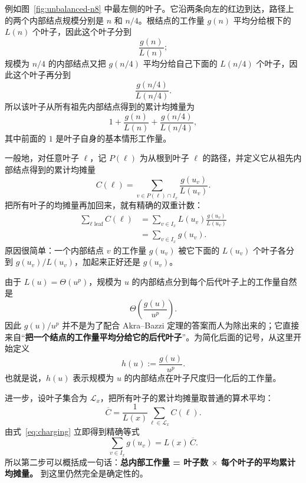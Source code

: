 \documentclass[11pt,a4paper]{article}
\begin{document}
例如图~\ref{fig:unbalanced-n8} 中最左侧的叶子。它沿两条向左的红边到达，路径上的两个内部结点规模分别是 $n$ 和 $n/4$。根结点的工作量 $g(n)$ 平均分给根下的 $L(n)$ 个叶子，因此这个叶子分到
\[
\frac{g(n)}{L(n)};
\]
规模为 $n/4$ 的内部结点又把 $g(n/4)$ 平均分给自己下面的 $L(n/4)$ 个叶子，因此这个叶子再分到
\[
\frac{g(n/4)}{L(n/4)}.
\]
所以该叶子从所有祖先内部结点得到的累计均摊量为
\[
1+\frac{g(n)}{L(n)}+\frac{g(n/4)}{L(n/4)},
\]
其中前面的 $1$ 是叶子自身的基本情形工作量。

一般地，对任意叶子 $\ell$，记 $P(\ell)$ 为从根到叶子 $\ell$ 的路径，并定义它从祖先内部结点得到的累计均摊量
\begin{equation}
C(\ell)=\sum_{v\in P(\ell)\cap I_x}\frac{g(u_v)}{L(u_v)}.
\end{equation}
把所有叶子的均摊量再加回来，就有精确的双重计数：
\begin{align}
\sum_{\ell\text{ leaf}} C(\ell)
&=\sum_{v\in I_x} L(u_v)\frac{g(u_v)}{L(u_v)}\\
&=\sum_{v\in I_x}g(u_v).
\label{eq:charging}
\end{align}
原因很简单：一个内部结点 $v$ 的工作量 $g(u_v)$ 被它下面的 $L(u_v)$ 个叶子各分到 $g(u_v)/L(u_v)$，加起来正好还是 $g(u_v)$。

由于 $L(u)=\Theta(u^p)$，规模为 $u$ 的内部结点分到每个后代叶子上的工作量自然是
\begin{equation}
\Theta\!\left(\frac{g(u)}{u^p}\right).
\end{equation}
因此 $g(u)/u^p$ 并不是为了配合 Akra--Bazzi 定理的答案而人为除出来的；它直接来自“\textbf{把一个结点的工作量平均分给它的后代叶子}”。为简化后面的记号，从这里开始定义
\begin{equation}
h(u):=\frac{g(u)}{u^p}.
\label{eq:normalized-per-leaf-work-v46}
\end{equation}
也就是说，$h(u)$ 表示规模为 $u$ 的内部结点在叶子尺度归一化后的工作量。

进一步，设叶子集合为 $\mathcal{L}_x$，把所有叶子的累计均摊量取普通的算术平均：
\begin{equation}
\overline{C}
=\frac{1}{L(x)}\sum_{\ell\in\mathcal{L}_x} C(\ell).
\label{eq:average-leaf-charge}
\end{equation}
由式~\eqref{eq:charging} 立即得到精确等式
\begin{equation}
\sum_{v\in I_x}g(u_v)=L(x)\,\overline{C}.
\label{eq:deterministic-leaf-average}
\end{equation}
所以第二步可以概括成一句话：\textbf{总内部工作量 = 叶子数 $\times$ 每个叶子的平均累计均摊量。} 到这里仍然完全是确定性的。
\end{document}
